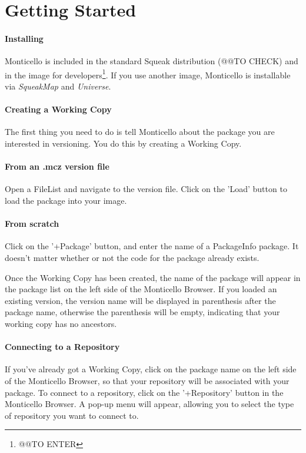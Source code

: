 \documentclass[a4paper,10pt,twoside]{book}
\begin{document}
\section{Getting Started}

\paragraph{Installing}

Monticello is included in the standard Squeak distribution (@@TO CHECK) and in the image for developers\footnote{@@TO ENTER}. If you use another image, Monticello is installable via \emph{SqueakMap} and \emph{Universe}.


\paragraph{Creating a Working Copy}

The first thing you need to do is tell Monticello about the package you are interested in versioning. You do this by creating a Working Copy.

\paragraph{From an .mcz version file}
Open a FileList and navigate to the version file. Click on the 'Load' button to load the package into your image.

\paragraph{From scratch}

Click on the '+Package' button, and enter the name of a PackageInfo package. It doesn't matter whether or not the code for the package already exists.

Once the Working Copy has been created, the name of the package will appear in the package list on the left side of the Monticello Browser. If you loaded an existing version, the version name will be displayed in parenthesis after the package name, otherwise the parenthesis will be empty, indicating that your working copy has no ancestors.

\paragraph{Connecting to a Repository}

If you've already got a Working Copy, click on the package name on the left side of the Monticello Browser, so that your repository will be associated with your package. To connect to a repository, click on the '+Repository' button in the Monticello Browser. A pop-up menu will appear, allowing you to select the type of repository you want to connect to.
\end{document}
